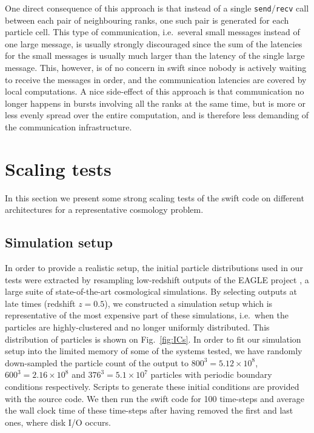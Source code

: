 \documentclass{sig-alternate-05-2015}
\newcommand{\swift}{{\sc swift}\xspace}
\begin{document}
One direct consequence of this approach is that instead of a single
{\tt send}/{\tt recv} call between each pair of neighbouring ranks,
one such pair is generated for each particle cell.
This type of communication, i.e.~several small messages instead of
one large message, is usually strongly discouraged since the sum of
the latencies for the small messages is usually much larger than
the latency of the single large message.
This, however, is of no concern in \swift since nobody is actively
waiting to receive the messages in order, and the communication
latencies are covered by local computations.
A nice side-effect of this approach is that communication no longer
happens in bursts involving all the ranks at the same time, but
is more or less evenly spread over the entire computation, and is
therefore less demanding of the communication infrastructure.




\section{Scaling tests}

In this section we present some strong scaling tests of the \swift code on different
architectures for a representative cosmology problem.

\subsection{Simulation setup}

In order to provide a realistic setup, 
the initial particle distributions used in our tests were extracted by
resampling low-redshift outputs of the EAGLE project \cite{Schaye2015}, a
large suite of state-of-the-art cosmological simulations. By selecting outputs
at late times (redshift $z=0.5$), we constructed a simulation setup which is
representative of the most expensive part of these simulations, i.e.~when the
particles are highly-clustered and no longer uniformly distributed. This
distribution of particles is shown on Fig.~\ref{fig:ICs}.
In order to fit our simulation setup into the limited
memory of some of the systems tested, we have randomly down-sampled the particle
count of the output to $800^3=5.12\times10^8$, $600^3=2.16\times10^8$ and
$376^3=5.1\times10^7$ particles with periodic boundary conditions 
respectively. Scripts to generate these initial
conditions are provided with the source code. We then run the \swift code for
100 time-steps and average the wall clock time of these time-steps after having
removed the first and last ones, where disk I/O occurs.
\end{document}
